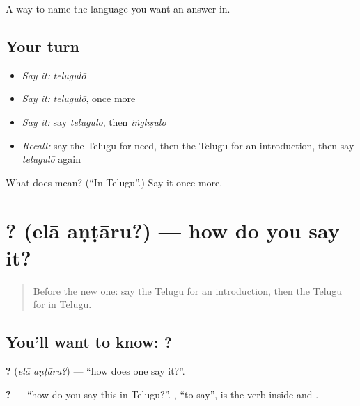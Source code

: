 \begin{grammarlens}[title={What you've built}]
A way to name the language you want an answer in.
\end{grammarlens}

\subsection*{Your turn}
\begin{itemize}
\raggedright
  \item \emph{Say it:} \emph{telugulō}
  \item \emph{Say it:} \emph{telugulō}, once more
  \item \emph{Say it:} say \emph{telugulō}, then \emph{iṅglīṣulō}
  \item \emph{Recall:} say the Telugu for need, then the Telugu for an introduction, then say \emph{telugulō} again
\end{itemize}

\begin{tcolorbox}[breakable,colback=teal!4,colframe=teal!35!black,title={Before you move on}]
What does  mean? (\textquotedblleft{}In Telugu\textquotedblright{}.) Say it once more.
\end{tcolorbox}
\section[\texorpdfstring{\te{ఎలా} \te{అంటారు}? (elā aṇṭāru?)}{ఎలా అంటారు? (elā aṇṭāru?)}]{ ? (elā aṇṭāru?) — how do you say it?}

\label{lesson:TE-C95-howsay}



\begin{quote}
Before the new one: say the Telugu for an introduction, then the Telugu for in Telugu.
\end{quote}

\subsection*{You'll want to know:  ?}
\textbf{ ?} (\emph{elā aṇṭāru?}) — \textquotedblleft{}how does one say it?\textquotedblright{}.

\textbf{   ?} — \textquotedblleft{}how do you say this in Telugu?\textquotedblright{}. \textbf{}, \textquotedblleft{}to say\textquotedblright{}, is the verb inside \textbf{} and \textbf{}.

